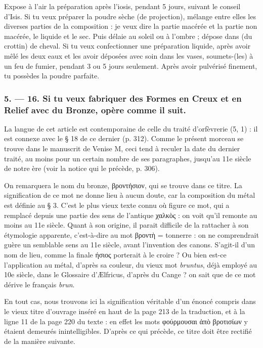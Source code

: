 \documentclass[a4paper, 11pt, oneside, polutonikogreek, french]{article}
\begin{document}
Expose à l'air la préparation après l'iosis, pendant 5 jours, suivant le conseil d'Isis. Si tu veux préparer la poudre sèche (de projection), mélange entre elles les diverses parties de la composition : je veux dire la partie macérée et la partie non macérée, le liquide et le sec. Puis délaie au soleil ou à l'ombre ; dépose dans (du crottin) de cheval. Si tu veux confectionner une préparation liquide, après avoir mêlé les deux eaux et les avoir déposées avec soin dans les vases, soumets-(les) à un feu de fumier, pendant 3 ou 5 jours seulement. Après avoir pulvérisé finement, tu possèdes la poudre parfaite.

\bigskip
\centerline{\EightStarTaper}
\centerline{\EightStarTaper\EightStarTaper}
\bigskip

\subsubsection{5. --- 16. Si tu veux fabriquer des Formes en Creux et en Relief avec du Bronze, opère comme il suit.}

La langue de cet article est contemporaine de celle du traité d'orfèvrerie (5, 1) : il est connexe avec le § 18 de ce dernier (p. 312). Comme le présent morceau se trouve dans le manuscrit de Venise M, ceci tend à reculer la date du dernier traité, au moins pour un certain nombre de ses paragraphes, jusqu'au 11e siècle de notre ère (voir la notice qui le précède, p. 306).

On remarquera le nom du bronze, βροντήσιον, qui se trouve dans ce titre. La signification de ce mot ne donne lieu à aucun doute, car la composition du métal est définie au § 3. C'est le plus vieux texte connu où figure ce mot, qui a remplacé depuis une partie des sens de l'antique χαλκὸς : on voit qu'il remonte au moins au 11e siècle. Quant à son origine, il parait difficile de la rattacher à son étymologie apparente, c'est-à-dire au mot βροντὴ = tonnerre : on ne comprendrait guère un semblable sens au 11e siècle, avant l'invention des canons. S'agit-il d'un nom de lieu, comme la finale ήσιος porterait à le croire ? Ou bien est-ce l'application au métal, d'après sa couleur, du vieux mot \emph{bruntus}, déjà employé au 10e siècle, dans le Glossaire d'Ælfricus, d'après du Cange ? on sait que de ce mot dérive le français \emph{brun}.

En tout cas, nous trouvons ici la signification véritable d'un énoncé compris dans le vieux titre d'ouvrage inséré en haut de la page 213 de la traduction, et à la ligne 11 de la page 220 du texte : en effet les mots φούρμουσαι ἀπὸ βροτισίων y étaient demeurés inintelligibles. D'après ce qui précède, ce titre doit être rectifié de la manière suivante.
\end{document}
